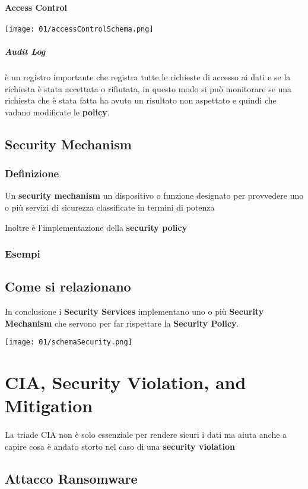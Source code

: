                 \paragraph{Access Control}
                    \texttt{[image: 01/accessControlSchema.png]}
                    \subparagraph{Audit Log} è un registro importante che registra tutte le richieste di accesso ai dati e se la richiesta è stata accettata o rifiutata, in questo modo si può monitorare se una richiesta che è stata fatta ha avuto un risultato non aspettato e quindi che vadano modificate le \textbf{policy}.
    \subsection{Security Mechanism}
    \label{subsec:securityMechanism}
        \subsubsection{Definizione} Un \textbf{security mechanism} un dispositivo o funzione designato per provvedere uno o più servizi di sicurezza classificate in termini di potenza
            
            Inoltre è l'implementazione della \textbf{security policy}
        \subsubsection{Esempi}
    \subsection{Come si relazionano}
        In conclusione i \textbf{Security Services} implementano uno o più \textbf{Security Mechanism} che servono per far rispettare la \textbf{Security Policy}.
        
        \texttt{[image: 01/schemaSecurity.png]}
\section{CIA, Security Violation, and Mitigation}
    \paragraph{} La triade CIA non è solo essenziale per rendere sicuri i dati ma aiuta anche a capire cosa è andato storto nel caso di una \textbf{security violation}
    \subsection{Attacco Ransomware}
